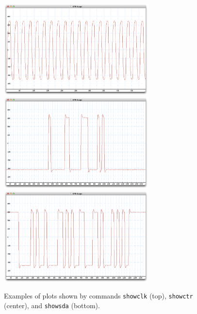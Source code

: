 \begin{figure}[hbtp]
    \begin{center}
	\includegraphics[width=0.70\textwidth]{img/scope_clk.png}
	\includegraphics[width=0.70\textwidth]{img/scope_ctr.png}
	\includegraphics[width=0.70\textwidth]{img/scope_sda.png}
	\caption{Examples of plots shown by commands \texttt{showclk} (top), \texttt{showctr} (center), and \texttt{showsda} (bottom).}
	\label{fig:DTBscopes}
    \end{center}
\end{figure}

